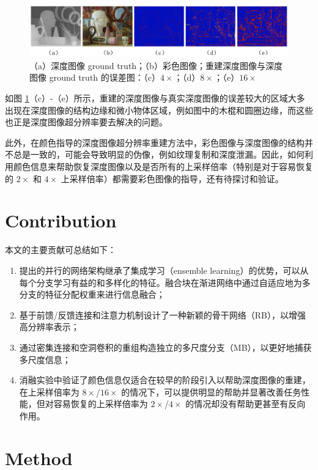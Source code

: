 \documentclass[14px]{article}
\begin{document}
\begin{figure}[!htbp]
\centering
	\includegraphics[width=\textwidth]{img/motivation}
	\caption{（a）深度图像 ground truth；（b）彩色图像；重建深度图像与深度图像 ground truth 的误差图：（c）$4\times$；（d）$8\times$；（e）$16\times$ }
	\label{fig:motivation}
\end{figure}

如图 \ref{fig:motivation}（c）-（e）所示，重建的深度图像与真实深度图像的误差较大的区域大多出现在深度图像的结构边缘和微小物体区域，例如图中的木棍和圆圈边缘，而这些也正是深度图像超分辨率要去解决的问题。

此外，在颜色指导的深度图像超分辨率重建方法中，彩色图像与深度图像的结构并不总是一致的，可能会导致明显的伪像，例如纹理复制和深度泄漏。因此，如何利用颜色信息来帮助恢复深度图像以及是否所有的上采样倍率（特别是对于容易恢复的 $2\times$ 和 $4\times$ 上采样倍率）都需要彩色图像的指导，还有待探讨和验证。


\section{Contribution}
\label{contribution}

本文的主要贡献可总结如下：
\begin{enumerate}
	
	\item[(1)]	提出的并行的网络架构继承了集成学习（ensemble learning）的优势，可以从每个分支学习有益的和多样化的特征。融合块在渐进网络中通过自适应地为多分支的特征分配权重来进行信息融合；
\item[(2)]	基于前馈/反馈连接和注意力机制设计了一种新颖的骨干网络（RB），以增强高分辨率表示；
\item[(3)]	通过密集连接和空洞卷积的重组构造独立的多尺度分支（MB），以更好地捕获多尺度信息；
\item[(4)]	消融实验中验证了颜色信息仅适合在较早的阶段引入以帮助深度图像的重建，在上采样倍率为 $8\times$/$16\times$ 的情况下，可以提供明显的帮助并显著改善任务性能，但对容易恢复的上采样倍率为 $2\times$/$4\times$ 的情况却没有帮助更甚至有反向作用。
\end{enumerate}


\section{Method}
\label{method}
\end{document}
